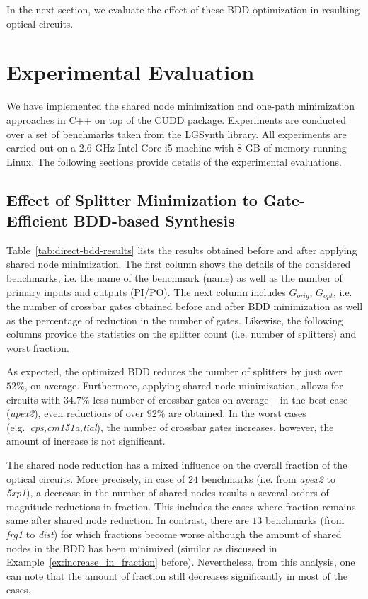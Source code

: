 \documentclass[10pt,letterpaper,twoside,openright]{book}
\begin{document}
In the next section, we evaluate the effect of these BDD optimization in resulting optical circuits.

\section{Experimental Evaluation}\label{sec:bdd-min-results}

We have implemented the shared node minimization and one-path minimization approaches in C++ on top of the CUDD package. Experiments are conducted over a set of benchmarks taken from the LGSynth library. All experiments are carried out on a 2.6 GHz Intel Core i5 machine with 8 GB of memory running Linux. The following sections provide details of the experimental evaluations. 

\subsection{Effect of Splitter Minimization to Gate-Efficient BDD-based Synthesis}

Table~\ref{tab:direct-bdd-results} lists the results obtained before and after applying shared node minimization. The first column shows the details of the considered benchmarks, i.e. the name of the benchmark (name) as well as the number of primary inputs and outputs (PI/PO). The next column includes $G_{orig}$, $G_{opt}$, i.e. the number of crossbar gates obtained before and after BDD minimization as well as the percentage of reduction in the number of gates. Likewise, the following columns provide the statistics on the splitter count (i.e. number of splitters) and worst fraction.

As expected, the optimized BDD reduces the number of splitters by just over $52\%$, on average. Furthermore, applying shared node minimization, allows for circuits with $34.7\%$ less number of crossbar gates on average -- in the best case (\emph{apex2}), even reductions of over $92\%$ are obtained. In the worst cases (e.g.~\emph{cps,cm151a,tial}), the number of crossbar gates increases, however, the amount of increase is not significant.

The shared node reduction has a mixed influence on the overall fraction of the optical circuits. More precisely, in case of $24$ benchmarks (i.e. from \emph{apex2} to \emph{5xp1}), a decrease in the number of shared nodes results a several orders of magnitude reductions in fraction. This includes the cases where fraction remains same after shared node reduction. In contrast, there are $13$ benchmarks (from \emph{frg1} to \emph{dist}) for which fractions become worse although the amount of shared nodes in the BDD has been minimized (similar as discussed in Example~\ref{ex:increase_in_fraction} before). Nevertheless, from this analysis, one can note that the amount of fraction still decreases significantly in most of the cases. 
\end{document}
